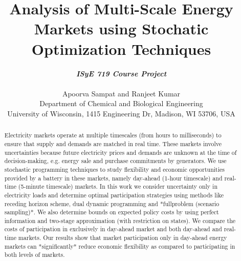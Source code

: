 \documentclass[11pt,twoside]{article}
\begin{document}
\title{Analysis of Multi-Scale Energy Markets using Stochatic Optimization Techniques}

\author{\textbf{\textit{ISyE 719 Course Project}}\\ \\Apoorva Sampat and Ranjeet Kumar\\
 {\small Department of Chemical and Biological Engineering}\\
 {\small \;University of Wisconsin, 1415 Engineering Dr, Madison, WI 53706, USA}}
\date{}
\maketitle

\begin{abstract}

Electricity markets operate at multiple timescales (from hours to milliseconds) to ensure that supply and demands are matched in real time. These markets involve uncertainties because future electricity prices and demands are unknown at the time of decision-making, e.g. energy sale and purchase commitments by generators. We use stochastic programming techniques to study flexibility and economic opportunities provided by a battery in these markets, namely day-ahead (1-hour timescale) and real-time (5-minute timescale) markets. In this work we consider uncertainty only in electricity loads and determine optimal participation strategies using methods like receding horizon scheme, dual dynamic programming and *fullproblem (scenario sampling)*. We also determine bounds on expected policy costs by using perfect information and two-stage approximation (with restriction on states). We compare the costs of participation in exclusively in day-ahead market and both day-ahead and real-time markets. Our results show that market participation only in day-ahead energy markets can *significantly* reduce economic flexibility as compared to participating in both levels of markets.
\end{abstract}
\end{document}
